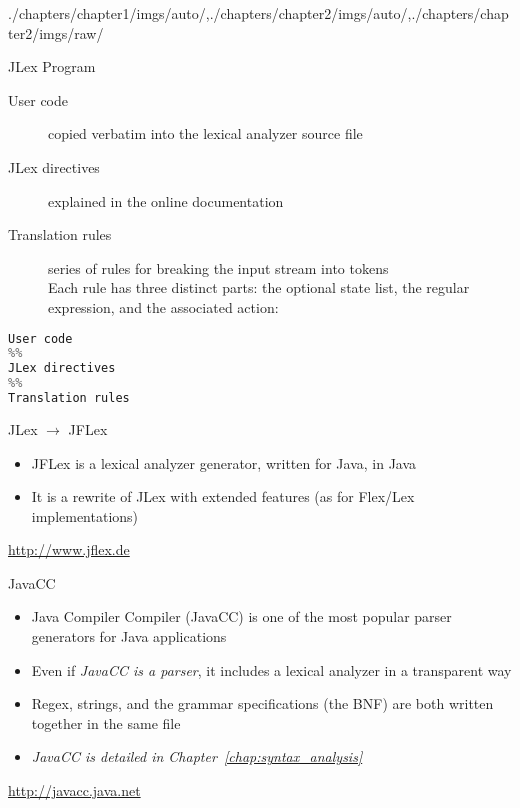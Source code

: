 \begin{graphicspathcontext}{{./chapters/chapter1/imgs/auto/},{./chapters/chapter2/imgs/auto/},{./chapters/chapter2/imgs/raw/}}
\begin{bibunit}[apalike]
\begin{frame}[fragile,background={10}]{JLex Program}
	\begin{description}
	\item[User code] copied verbatim into the lexical analyzer source file
	\item[JLex directives] explained in the online documentation
	\item[Translation rules] series of rules for breaking the input stream into tokens \\
		Each rule has three distinct parts: the optional state list, the regular expression, and the associated action:
		\begin{center}
		\end{center}
	\end{description}
	\vfill
	\begin{lstlisting}[language=Python]
User code
%%
JLex directives
%%
Translation rules
	\end{lstlisting}
\end{frame}

\begin{frame}[background=9]{JLex $\rightarrow$ JFLex}
	\begin{itemize}
	\item JFLex  is a lexical analyzer generator, written for Java, in Java
	\vfill
	\item It is a rewrite of JLex with extended features (as for Flex/Lex implementations)
	\end{itemize}
	\vfill
	\begin{center}
	\url{http://www.jflex.de}
	\end{center}
\end{frame}

\begin{frame}[background=8]{JavaCC}
	\begin{itemize}
	\item Java Compiler Compiler (JavaCC) is one of the most popular parser generators for Java applications
	\vfill
	\item Even if \emph{JavaCC is a parser}, it includes a lexical analyzer in a transparent way
	\vfill
	\item Regex, strings, and the grammar specifications (the BNF) are both written together in the same file
	\vfill
	\item \emph{JavaCC is detailed in Chapter~\ref{chap:syntax_analysis}}
	\end{itemize}
	\vfill
	\begin{center}
	\url{http://javacc.java.net}
	\end{center}
\end{frame}


\end{bibunit}
\end{graphicspathcontext}

